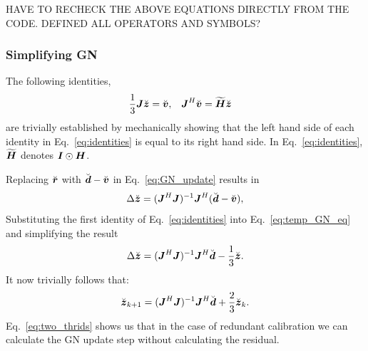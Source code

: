 \documentclass[useAMS,usenatbib]{mn2e}
\newcommand{\bz}{\bmath{z}}
\newcommand{\br}{\bmath{r}}
\newcommand{\bg}{\bmath{g}}
\newcommand{\bd}{\bmath{d}}
\newcommand{\bv}{\bmath{v}}
\newcommand{\bJ}{\bmath{J}}
\newcommand{\bH}{\bmath{H}}
\newcommand{\bI}{\bmath{I}}
\newcommand{\conj}[1]{\overline{#1}}
\begin{document}
HAVE TO RECHECK THE ABOVE EQUATIONS DIRECTLY FROM THE CODE.
DEFINED ALL OPERATORS AND SYMBOLS?




\subsubsection{Simplifying GN}

The following identities,
\begin{align}
\label{eq:identities}
\frac{1}{3}\bJ\breve{\bz} &= \breve{\bv}, & \bJ^H\breve{\bv} &= \widetilde{\bH}\breve{\bz} 
\end{align}
are trivially established by mechanically showing that the left hand side of each identity in Eq.~\eqref{eq:identities} is equal to its right hand side.
In Eq.~\eqref{eq:identities}, $\widetilde{\bH}$ denotes $\bI\odot\bH$.

Replacing $\breve{\br}$ with $\breve{\bd}-\breve{\bv}$ in Eq.~\eqref{eq:GN_update} results in
\begin{equation}
\label{eq:temp_GN_eq}
\Delta \breve{\bz} = (\bJ^H\bJ)^{-1}\bJ^H(\breve{\bd}-\breve{\bv}), 
\end{equation}
Substituting the first identity of Eq.~\eqref{eq:identities} into Eq.~\eqref{eq:temp_GN_eq} and simplifying the result 
\begin{equation}
\label{eq:one_thrid}
\Delta \breve{\bz} = (\bJ^H\bJ)^{-1}\bJ^H\breve{\bd}-\frac{1}{3}\breve{\bz}.
\end{equation}
It now trivially follows that:
\begin{equation}
\label{eq:two_thrids}
\breve{\bz}_{k+1} = (\bJ^H\bJ)^{-1}\bJ^H\breve{\bd} + \frac{2}{3}\breve{\bz}_{k}. 
\end{equation}
Eq.~\eqref{eq:two_thrids} shows us that in the case of redundant calibration we can calculate the GN update step without calculating the residual. 
% 
\end{document}
